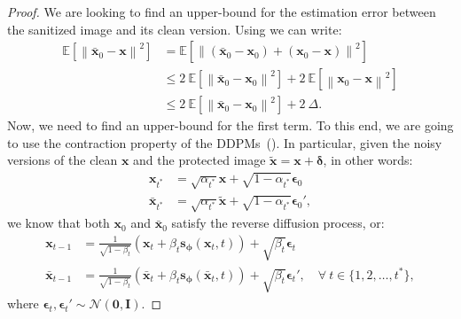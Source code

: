 \documentclass[conference]{IEEEtran}
\theoremstyle{definition}
\theoremstyle{remark}
\theoremstyle{proposition}
\newcommand{\norm}[1]{\left\lVert#1\right\rVert}
\begin{document}
\begin{proof}
    We are looking to find an upper-bound for the estimation error between the sanitized image and its clean version.
    Using  we can write:
    \begin{align}\label{eq:addition}\nonumber
        \mathbb{E}\left[\norm{\bar{\boldsymbol{x}}_{0} - \boldsymbol{x}}^2\right] &= \mathbb{E}\left[\norm{(\bar{\boldsymbol{x}}_{0} - \boldsymbol{x}_0) + (\boldsymbol{x}_0 - \boldsymbol{x})}^2\right]\\\nonumber
        & \leq 2~\mathbb{E}\left[\norm{\bar{\boldsymbol{x}}_{0} - \boldsymbol{x}_0}^2\right] + 2~\mathbb{E}\left[\norm{\boldsymbol{x}_0 - \boldsymbol{x}}^2\right]\\
        & \leq 2~\mathbb{E}\left[\norm{\bar{\boldsymbol{x}}_{0} - \boldsymbol{x}_0}^2\right] + 2~\Delta.
    \end{align}
    Now, we need to find an upper-bound for the first term.
    To this end, we are going to use the contraction property of the DDPMs~().
    In particular, given the noisy versions of the clean $\boldsymbol{x}$ and the protected image $\tilde{\boldsymbol{x}} = \boldsymbol{x} + \boldsymbol{\delta}$, in other words:
    \begin{align}\label{eq:forward_addition}\nonumber
        \boldsymbol{x}_{t^{*}} &= \sqrt{\alpha_{t^{*}}} \boldsymbol{x} + \sqrt{1 - \alpha_{t^{*}}} \boldsymbol{\epsilon}_0
        \\
        \bar{\boldsymbol{x}}_{t^{*}} &= \sqrt{\alpha_{t^{*}}} \tilde{\boldsymbol{x}} + \sqrt{1 - \alpha_{t^{*}}} \boldsymbol{\epsilon}_0',
    \end{align}
    we know that both $\boldsymbol{x}_0$ and $\bar{\boldsymbol{x}}_0$ satisfy the reverse diffusion process, or:
    \begin{align}\label{eq:reverse_addition}\nonumber
        \boldsymbol{x}_{t-1}&=\frac{1}{\sqrt{1-\beta_{t}}}\left(\boldsymbol{x}_{t}+\beta_{t} \mathbf{s}_{\boldsymbol{\phi}}(\boldsymbol{x}_{t}, t)\right)+\sqrt{\beta_{t}} \boldsymbol{\epsilon}_{t}
        \\
        \bar{\boldsymbol{x}}_{t-1}&=\frac{1}{\sqrt{1-\beta_{t}}}\left(\bar{\boldsymbol{x}}_{t}+\beta_{t} \mathbf{s}_{\boldsymbol{\phi}}(\bar{\boldsymbol{x}}_{t}, t)\right)+\sqrt{\beta_{t}} \boldsymbol{\epsilon}_{t}', \quad \forall~t \in \{1, 2, \dots, t^{*}\},
    \end{align}
    where $\boldsymbol{\epsilon}_{t}, \boldsymbol{\epsilon}_{t}' \sim \mathcal{N}(\mathbf{0}, \mathbf{I})$.

\end{proof}
\end{document}
